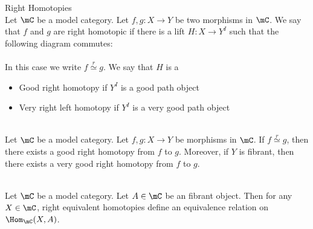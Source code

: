 \documentclass[a4paper]{article}
\begin{document}
\begin{defn}{Right Homotopies}{}\\ Let $\mC$ be a model category. Let $f,g:X\to Y$ be two morphisms in $\mC$. We say that $f$ and $g$ are right homotopic if there is a lift $H:X\to Y^I$ such that the following diagram commutes: \\
\\
In this case we write $f\overset{r}{\simeq}g$. We say that $H$ is a 
\begin{itemize}
\item Good right homotopy if $Y^I$ is a good path object
\item Very right left homotopy if $Y^I$ is a very good path object
\end{itemize}
\end{defn}

\begin{prp}{}{}\\ Let $\mC$ be a model category. Let $f,g:X\to Y$ be morphisms in $\mC$. If $f\overset{r}{\simeq}g$, then there exists a good right homotopy from $f$ to $g$. Moreover, if $Y$ is fibrant, then there exists a very good right homotopy from $f$ to $g$. 
\end{prp}

\begin{prp}{}{}\\ Let $\mC$ be a model category. Let $A\in\mC$ be an fibrant object. Then for any $X\in\mC$, right equivalent homotopies define an equivalence relation on $\Hom_\mC(X,A)$. 
\end{prp}
\end{document}
